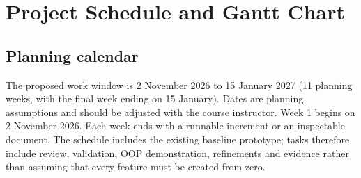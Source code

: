 \documentclass[11pt,a4paper]{article}
\begin{document}
\section{Project Schedule and Gantt Chart}
\subsection{Planning calendar}
The proposed work window is 2 November 2026 to 15 January 2027 (11 planning weeks, with the final week ending on 15 January). Dates are planning assumptions and should be adjusted with the course instructor. Week 1 begins on 2 November 2026. Each week ends with a runnable increment or an inspectable document. The schedule includes the existing baseline prototype; tasks therefore include review, validation, OOP demonstration, refinements and evidence rather than assuming that every feature must be created from zero.
\end{document}
